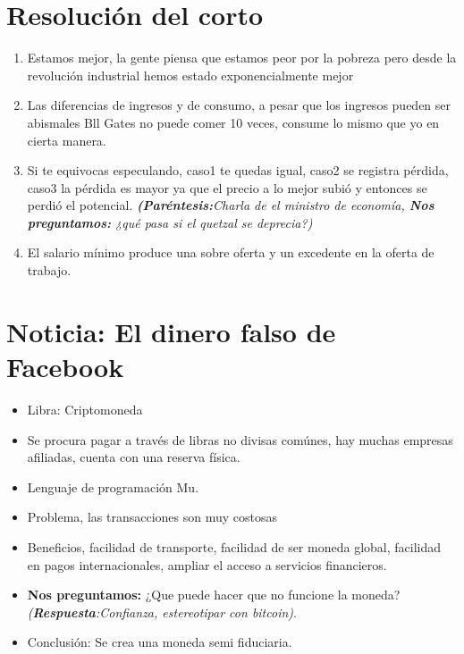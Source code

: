 \section{Resolución del corto}
\begin{enumerate}
    \item Estamos mejor, la gente piensa que estamos peor por la pobreza pero desde la revolución industrial hemos estado exponencialmente mejor
    \item Las diferencias de ingresos y de consumo, a pesar que los ingresos pueden ser abismales Bll Gates no puede comer 10 veces, consume lo mismo que yo en cierta manera.
    \item Si te equivocas especulando, caso1 te quedas igual, caso2 se registra pérdida, caso3 la pérdida es mayor ya que el precio a lo mejor subió y entonces se perdió el potencial. \emph{\textbf{(Paréntesis:}Charla de el ministro de economía, \textbf{Nos preguntamos:} ¿qué pasa si el quetzal se deprecia?)}
    \item El salario mínimo produce una sobre oferta y un excedente en la oferta de trabajo.
\end{enumerate}

\section{Noticia: El dinero falso de Facebook}
\begin{itemize}
    \item Libra: Criptomoneda
    \item Se procura pagar a través de libras no divisas comúnes, hay muchas empresas afiliadas, cuenta con una reserva física.
    \item Lenguaje de programación Mu.
    \item Problema, las transacciones son muy costosas
    \item Beneficios, facilidad de transporte, facilidad de ser moneda global, facilidad en pagos internacionales, ampliar el acceso a servicios financieros.
    \item \textbf{Nos preguntamos:} ¿Que puede hacer que no funcione la moneda? \emph{(\textbf{Respuesta}:Confianza, estereotipar con bitcoin)}.
    \item Conclusión: Se crea una moneda semi fiduciaria.
\end{itemize}



